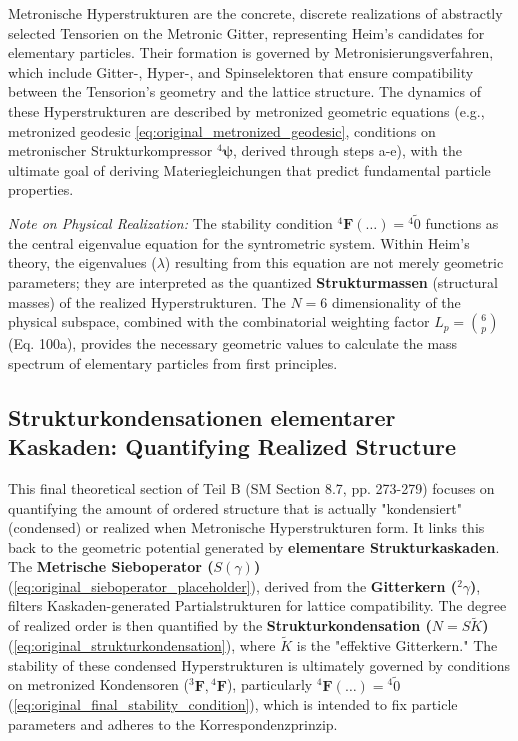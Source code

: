 \documentclass[12pt]{article}
\newcommand{\metrischesieboperator}{S(\gamma)}
\newcommand{\metronischerstrukturkompressor}{{}^4\bm{\psi}}
\newcommand{\metronisiertekondensor}[1]{{}^{#1}\mathbf{F}}
\begin{document}
Metronische Hyperstrukturen are the concrete, discrete realizations of abstractly selected Tensorien on the Metronic Gitter, representing Heim's candidates for elementary particles. Their formation is governed by Metronisierungsverfahren, which include Gitter-, Hyper-, and Spinselektoren that ensure compatibility between the Tensorion's geometry and the lattice structure. The dynamics of these Hyperstrukturen are described by metronized geometric equations (e.g., metronized geodesic \eqref{eq:original_metronized_geodesic}, conditions on metronischer Strukturkompressor \(\metronischerstrukturkompressor\), derived through steps a-e), with the ultimate goal of deriving Materiegleichungen that predict fundamental particle properties.

\textit{Note on Physical Realization:} The stability condition $\metronisiertekondensor{4}(\dots) = {}^{4}\tilde{0}$ functions as the central eigenvalue equation for the syntrometric system. Within Heim's theory, the eigenvalues ($\lambda$) resulting from this equation are not merely geometric parameters; they are interpreted as the quantized \textbf{Strukturmassen} (structural masses) of the realized Hyperstrukturen. The $N=6$ dimensionality of the physical subspace, combined with the combinatorial weighting factor $L_p = \binom{6}{p}$ (Eq. 100a), provides the necessary geometric values to calculate the mass spectrum of elementary particles from first principles.

\subsection{Strukturkondensationen elementarer Kaskaden: Quantifying Realized Structure}
\label{sec:strukturkondensation}

This final theoretical section of Teil B (SM Section 8.7, pp. 273-279) focuses on quantifying the amount of ordered structure that is actually "kondensiert" (condensed) or realized when Metronische Hyperstrukturen form. It links this back to the geometric potential generated by \textbf{elementare Strukturkaskaden}. The \textbf{Metrische Sieboperator (\(\metrischesieboperator\))} (\eqref{eq:original_sieboperator_placeholder}), derived from the \textbf{Gitterkern (\({}^2\gamma\))}, filters Kaskaden-generated Partialstrukturen for lattice compatibility. The degree of realized order is then quantified by the \textbf{Strukturkondensation (\(N = S\tilde{K}\))} (\eqref{eq:original_strukturkondensation}), where \(\tilde{K}\) is the "effektive Gitterkern." The stability of these condensed Hyperstrukturen is ultimately governed by conditions on metronized Kondensoren (\(\metronisiertekondensor{3}, \metronisiertekondensor{4}\)), particularly \( \metronisiertekondensor{4}(\dots) = {}^{4}\tilde{0} \) (\eqref{eq:original_final_stability_condition}), which is intended to fix particle parameters and adheres to the Korrespondenzprinzip.
\end{document}
